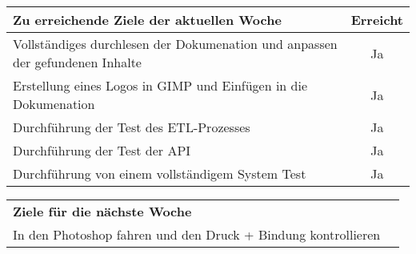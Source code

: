 \begin{tabularx}{\textwidth}{Xc}
    \arrayrulecolor{OliveGreen}
    \toprule
    {\bfseries Zu erreichende Ziele der aktuellen Woche} & {\bfseries Erreicht} \\
    \midrule[2pt]
    Vollständiges durchlesen der Dokumenation und anpassen der gefundenen
    Inhalte &Ja \\
    \rowcolor{OliveGreen!15}
    Erstellung eines Logos in GIMP und Einfügen in die Dokumenation &Ja \\
    \rowcolor{White}
    Durchführung der Test des ETL-Prozesses &Ja \\
    \rowcolor{White}
    Durchführung der Test der API &Ja \\
    \rowcolor{White}
    Durchführung von einem vollständigem System Test &Ja \\
    \bottomrule[2pt]
\end{tabularx}
%
\vspace{1cm}
%
\begin{tabularx}{\textwidth}{Xc}
    \arrayrulecolor{OliveGreen}
    \toprule
    {\bfseries Ziele für die nächste Woche}              &                   \\
    In den Photoshop fahren und den Druck + Bindung kontrollieren & \\
    \midrule[2pt]
\end{tabularx}
